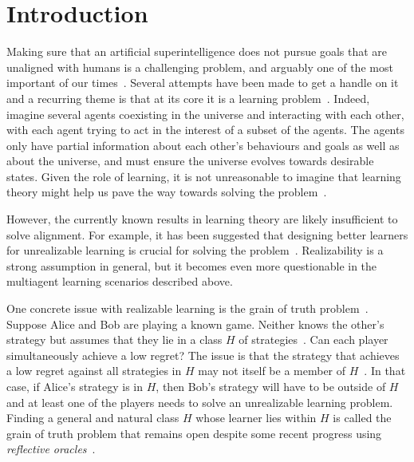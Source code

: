 
\section{Introduction}
Making sure that an artificial superintelligence does not pursue goals that are unaligned with humans is a challenging problem, and arguably one of the most important of our times~\citep{ngo2024alignment,bengio2024managing}. Several attempts have been made to get a handle on it~\citep{russell2015research,amodei2016concrete,everitt2018agi,ji2023alignment} and a recurring theme is that at its core it is a learning problem~\citep{dewey2011learning,bostrom2014superintelligence,soares2016value,russell2019human,ng2000algorithms,hadfieldmenell2016cooperative,hadfieldmenell2017inverse,milli2017obedient,jeon2020reward,christiano2017deep,leike2018scalable,ouyang2022training,bai2022training,shah2019preferences,armstrong2018occam,hubinger2019risks,casper2023open}. Indeed, imagine several agents coexisting in the universe and interacting with each other, with each agent trying to act in the interest of a subset of the agents. The agents only have partial information about each other's behaviours and goals as well as about the universe, and must ensure the universe evolves towards desirable states. Given the role of learning, it is not unreasonable to imagine that learning theory might help us pave the way towards solving the problem~\citep{kosoy2018learningagenda}.

However, the currently known results in learning theory are likely insufficient to solve alignment. For example, it has been suggested that designing better learners for unrealizable learning is crucial for solving the problem~\citep{kosoy2018learningagenda, demski2019embedded}. Realizability is a strong assumption in general, but it becomes even more questionable in the multiagent learning scenarios described above.

One concrete issue with realizable learning is the grain of truth problem~\citep{hutter2009open,leike2016grain,wyeth2025grain,kosoy2023agenda}. Suppose Alice and Bob are playing a known game. Neither knows the other's strategy but assumes that they lie in a class $H$ of strategies~\citep{kalai1993rational,noguchi2015bayesian}. Can each player simultaneously achieve a low regret? The issue is that the strategy that achieves a low regret against all strategies in $H$ may not itself be a member of $H$~\citep{nachbar1997prediction,nachbar2005beliefs}. In that case, if Alice's strategy is in $H$, then Bob's strategy will have to be outside of $H$ and at least one of the players needs to solve an unrealizable learning problem. Finding a general and natural class $H$ whose learner lies within $H$ is called the grain of truth problem that remains open despite some recent progress using \emph{reflective oracles}~\citep{fallenstein2015reflective,leike2016grain,wyeth2025grain}.

